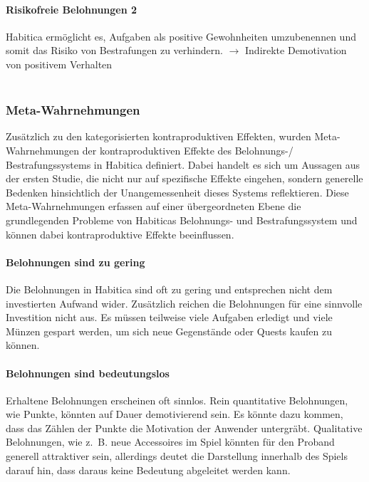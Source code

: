 \documentclass[sigconf, nonacm]{acmart}
\begin{document}
\paragraph{Risikofreie Belohnungen 2}\label{sec:cpe7}
Habitica ermöglicht es, Aufgaben als positive Gewohnheiten umzubenennen und somit das Risiko von Bestrafungen zu verhindern.
$\rightarrow$ Indirekte Demotivation von positivem Verhalten 
\\
\\
\subsubsection{Meta-Wahrnehmungen}
Zusätzlich zu den kategorisierten kontraproduktiven Effekten, wurden Meta-Wahrnehmungen der kontraproduktiven Effekte des Belohnungs-/ Bestrafungssystems in Habitica definiert. Dabei handelt es sich um Aussagen aus der ersten Studie, die nicht nur auf spezifische Effekte eingehen, sondern generelle Bedenken hinsichtlich der Unangemessenheit dieses Systems reflektieren. Diese Meta-Wahrnehmungen erfassen auf einer übergeordneten Ebene die grundlegenden Probleme von Habiticas Belohnungs- und Bestrafungssystem und können dabei kontraproduktive Effekte beeinflussen.

\paragraph{Belohnungen sind zu gering}\label{sec:acpe1}
Die Belohnungen in Habitica sind oft zu gering und entsprechen nicht dem investierten Aufwand wider. Zusätzlich reichen die Belohnungen für eine sinnvolle Investition nicht aus. Es müssen teilweise viele Aufgaben erledigt und viele Münzen gespart werden, um sich neue Gegenstände oder Quests kaufen zu können.

\paragraph{Belohnungen sind bedeutungslos}\label{sec:acpe2}
Erhaltene Belohnungen erscheinen oft sinnlos. Rein quantitative Belohnungen, wie Punkte, könnten auf Dauer demotivierend sein. Es könnte dazu kommen, dass das Zählen der Punkte die Motivation der Anwender untergräbt. Qualitative Belohnungen, wie z.~B. neue Accessoires im Spiel könnten für den Proband generell attraktiver sein, allerdings deutet die Darstellung innerhalb des Spiels darauf hin, dass daraus keine Bedeutung abgeleitet werden kann.
\end{document}
